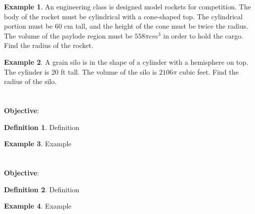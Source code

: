 \documentclass{report}
\theoremstyle{definition}
\newtheorem{example}{\bf Example}
\newtheorem{definition}{\bf Definition}[section]
\begin{document}
\vfill

\begin{example}
An engineering class is designed model rockets for competition. The body of the rocket must be cylindrical with a cone-shaped top. The cylindrical portion must be 60 cm tall, and the height of the cone must be twice the radius. The volume of the paylode region must be $558\pi cm^3$ in order to hold the cargo. Find the radius of the rocket. 
\end{example}
\vfill


\begin{example}
A grain silo is in the shape of a cylinder with a hemisphere on top. The cylinder is 20 ft tall. The volume of the silo is $2106\pi$ cubic feet. Find the radius of the silo.
\end{example}


\vfill
\noindent{}
 \newpage


 \section{   }
 \indent\hfill\small\noindent \textbf{Objective}:  \normalsize\\
 \setcounter{example}{0}
 \setcounter{definition}{0}
 \begin{definition}
     Definition
 \end{definition}
 \begin{example}
     Example
 \end{example}

\vfill
 \noindent{}
 \newpage

 \section{   }
 \indent\hfill\small\noindent \textbf{Objective}:  \normalsize\\
 \setcounter{example}{0}
 \setcounter{definition}{0}
 \begin{definition}
     Definition
 \end{definition}
 \begin{example}
     Example
 \end{example}
\end{document}
